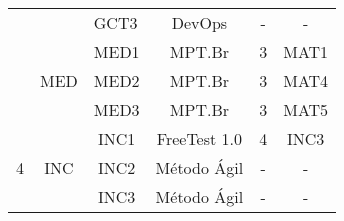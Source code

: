 \begin{table}[H]
{\begin{tabular}{|c|c|c|c|c|c|}
                                                                                      &                                           & \multicolumn{1}{l|}{GCT3} & DevOps                           & -                                                                               & -                                                                                    \\ \cline{2-6} 
                                                                                      & \multirow{3}{*}{MED}                      & MED1                      & MPT.Br                           & 3                                                                               & MAT1                                                                                 \\ \cline{3-6} 
                                                                                      &                                           & MED2                      & MPT.Br                           & 3                                                                               & MAT4                                                                                 \\ \cline{3-6} 
                                                                                      &                                           & MED3                      & MPT.Br                           & 3                                                                               & MAT5                                                                                 \\ \hline
\multirow{8}{*}{4}                                                                    & \multirow{4}{*}{INC}                      & INC1                      & FreeTest 1.0                     & 4                                                                               & INC3                                                                                 \\ \cline{3-6} 
                                                                                      &                                           & INC2                      & Método Ágil                      & -                                                                               & -                                                                                    \\ \cline{3-6} 
                                                                                      &                                           & INC3                      & Método Ágil                      & -                                                                               & -                                                                                    \\ \cline{3-6} 

\end{tabular}}
\end{table}

